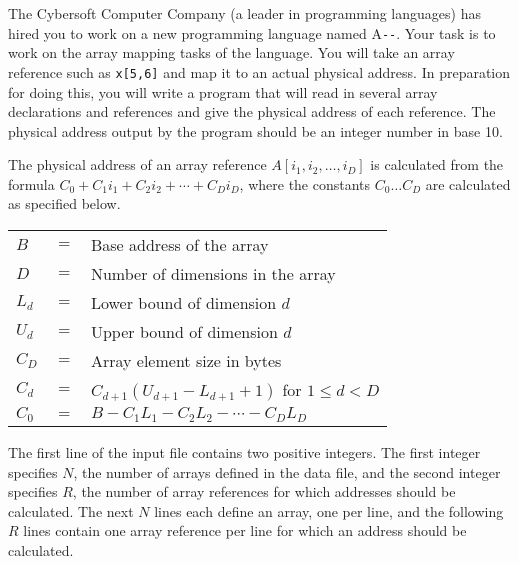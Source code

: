


\pagestyle{contest}


\maketitle


The Cybersoft Computer Company (a leader in programming languages) has
hired you to work on a new programming language named A\verb|--|.
Your task is to work on the array mapping tasks of the language.  You
will take an array reference such as \verb'x[5,6]' and map it to an
actual physical address.  In preparation for doing this, you will
write a program that will read in several array declarations and
references and give the physical address of each reference.  The
physical address output by the program should be an integer number in
base 10.

The physical address of an array reference $A[i_1,i_2,\ldots,i_D]$ is
calculated from the formula $C_0 + C_1 i_1 + C_2 i_2 + \cdots + C_D
i_D$, where the constants $C_0\ldots C_D$ are calculated as specified
below.

\begin{tabular}{lcl}
$B$   & $=$ & Base address of the array \\
$D$   & $=$ & Number of dimensions in the array \\
$L_d$ & $=$ & Lower bound of dimension $d$ \\
$U_d$ & $=$ & Upper bound of dimension $d$ \\
$C_D$ & $=$ & Array element size in bytes \\
$C_d$ & $=$ & $C_{d+1}(U_{d+1}-L_{d+1}+1)$ for $1\le d<D$ \\
$C_0$ & $=$ & $B - C_1 L_1 - C_2 L_2 - \cdots - C_D L_D$
\end{tabular}

\bigskip
{}

The first line of the input file contains two positive integers.  The
first integer specifies $N$, the number of arrays defined in the data
file, and the second integer specifies $R$, the number of array
references for which addresses should be calculated.  The next $N$
lines each define an array, one per line, and the following $R$ lines
contain one array reference per line for which an address should be
calculated.

